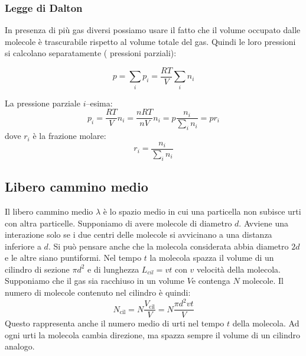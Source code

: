 \subsubsection{Legge di Dalton}
In presenza di più gas diversi possiamo usare il fatto che il volume occupato dalle molecole è trascurabile rispetto al volume totale del gas. Quindi le loro pressioni si calcolano separatamente ( pressioni parziali):
\begin{legge}[Dalton]
\begin{equation}
 p = \sum_i p_i = \frac{RT}{V}\sum_i{n_i}
\end{equation}
\end{legge}
La pressione parziale $i$--esima:
\begin{equation}
 p_i = \frac{RT}{V}n_i = \frac{nRT}{nV}n_i = p\frac{n_i}{\sum_i n_i} = pr_i
\end{equation}
dove $r_i$ è la frazione molare:
\begin{equation}
 r_i = \frac{n_i}{\sum_i n_i}
\end{equation}


\subsection{Libero cammino medio}
\label{libero cammino medio fisica1}
Il libero cammino medio $\lambda$ è lo spazio medio in cui una particella non subisce urti con altra particelle. Supponiamo di avere molecole di diametro $d$. Avviene una interazione solo se i due centri delle molecole si avvicinano a una distanza inferiore a $d$. Si può pensare anche che la molecola considerata abbia diametro $2d$ e le altre siano puntiformi. Nel tempo $t$ la molecola spazza il volume di un cilindro di sezione $\pi d^2$ e di lunghezza $L_{cil}=vt$ con $v$ velocità della molecola. Supponiamo che il gas sia racchiuso in un volume $V$e contenga $N$ molecole. Il numero di molecole contenuto nel cilindro è quindi:
\[N_{\text{cil}}=N\frac{V_{\text{cil}}}{V}=N\frac{\pi d^2vt}{V}\]
Questo rappresenta anche il numero medio di urti nel tempo $t$ della molecola. Ad ogni urti la molecola cambia direzione, ma spazza sempre il volume di un cilindro analogo.

